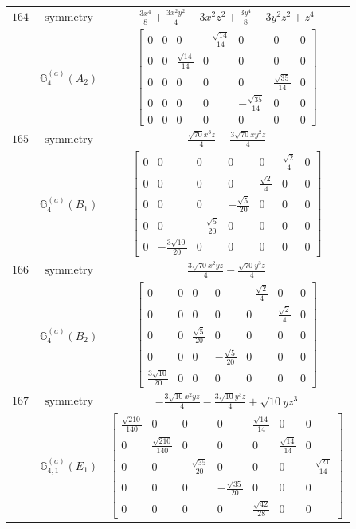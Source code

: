 \documentclass[fleqn,8pt,landscape]{jsarticle}
\begin{document}
\begin{longtable}{ccc}
$ 164 $ & $ \text{symmetry} $ & $ \frac{3 x^{4}}{8} + \frac{3 x^{2} y^{2}}{4} - 3 x^{2} z^{2} + \frac{3 y^{4}}{8} - 3 y^{2} z^{2} + z^{4} $ \\
$  $ & $ \mathbb{G}_{4}^{(a)}(A_{2}) $ & $ \begin{bmatrix} 0 & 0 & 0 & - \frac{\sqrt{14}}{14} & 0 & 0 & 0 \\ 0 & 0 & \frac{\sqrt{14}}{14} & 0 & 0 & 0 & 0 \\ 0 & 0 & 0 & 0 & 0 & \frac{\sqrt{35}}{14} & 0 \\ 0 & 0 & 0 & 0 & - \frac{\sqrt{35}}{14} & 0 & 0 \\ 0 & 0 & 0 & 0 & 0 & 0 & 0 \end{bmatrix} $ \\ \hline
$ 165 $ & $ \text{symmetry} $ & $ \frac{\sqrt{70} x^{3} z}{4} - \frac{3 \sqrt{70} x y^{2} z}{4} $ \\
$  $ & $ \mathbb{G}_{4}^{(a)}(B_{1}) $ & $ \begin{bmatrix} 0 & 0 & 0 & 0 & 0 & \frac{\sqrt{2}}{4} & 0 \\ 0 & 0 & 0 & 0 & \frac{\sqrt{2}}{4} & 0 & 0 \\ 0 & 0 & 0 & - \frac{\sqrt{5}}{20} & 0 & 0 & 0 \\ 0 & 0 & - \frac{\sqrt{5}}{20} & 0 & 0 & 0 & 0 \\ 0 & - \frac{3 \sqrt{10}}{20} & 0 & 0 & 0 & 0 & 0 \end{bmatrix} $ \\ \hline
$ 166 $ & $ \text{symmetry} $ & $ \frac{3 \sqrt{70} x^{2} y z}{4} - \frac{\sqrt{70} y^{3} z}{4} $ \\
$  $ & $ \mathbb{G}_{4}^{(a)}(B_{2}) $ & $ \begin{bmatrix} 0 & 0 & 0 & 0 & - \frac{\sqrt{2}}{4} & 0 & 0 \\ 0 & 0 & 0 & 0 & 0 & \frac{\sqrt{2}}{4} & 0 \\ 0 & 0 & \frac{\sqrt{5}}{20} & 0 & 0 & 0 & 0 \\ 0 & 0 & 0 & - \frac{\sqrt{5}}{20} & 0 & 0 & 0 \\ \frac{3 \sqrt{10}}{20} & 0 & 0 & 0 & 0 & 0 & 0 \end{bmatrix} $ \\ \hline
$ 167 $ & $ \text{symmetry} $ & $ - \frac{3 \sqrt{10} x^{2} y z}{4} - \frac{3 \sqrt{10} y^{3} z}{4} + \sqrt{10} y z^{3} $ \\
$  $ & $ \mathbb{G}_{4,1}^{(a)}(E_{1}) $ & $ \begin{bmatrix} \frac{\sqrt{210}}{140} & 0 & 0 & 0 & \frac{\sqrt{14}}{14} & 0 & 0 \\ 0 & \frac{\sqrt{210}}{140} & 0 & 0 & 0 & \frac{\sqrt{14}}{14} & 0 \\ 0 & 0 & - \frac{\sqrt{35}}{20} & 0 & 0 & 0 & - \frac{\sqrt{21}}{14} \\ 0 & 0 & 0 & - \frac{\sqrt{35}}{20} & 0 & 0 & 0 \\ 0 & 0 & 0 & 0 & \frac{\sqrt{42}}{28} & 0 & 0 \end{bmatrix} $ \\ \hline

\end{longtable}
\end{document}
